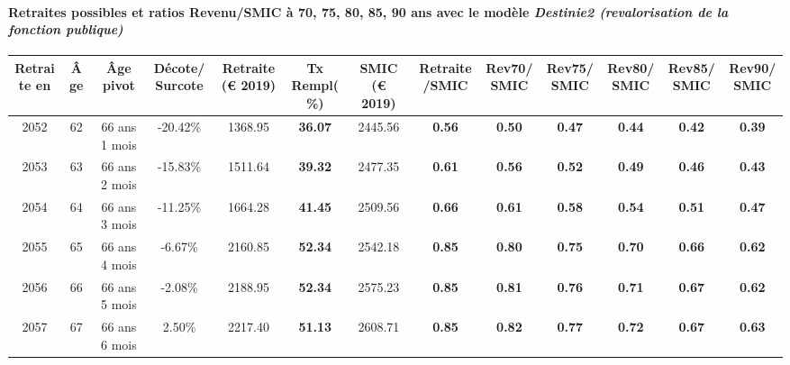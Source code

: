 \paragraph{Retraites possibles et ratios Revenu/SMIC à 70, 75, 80, 85, 90 ans avec le modèle \emph{Destinie2 (revalorisation de la fonction publique)}}  
 
{ \scriptsize \begin{center} 
\begin{tabular}[htb]{|c|c||c|c||c|c||c||c|c|c|c|c|c|} 
\hline 
 Retraite en &  Âge &  Âge pivot &  Décote/Surcote &  Retraite (\euro{} 2019) &  Tx Rempl(\%) &  SMIC (\euro{} 2019) &  Retraite/SMIC &  Rev70/SMIC &  Rev75/SMIC &  Rev80/SMIC &  Rev85/SMIC &  Rev90/SMIC \\ 
\hline \hline 
 2052 &  62 &  66 ans 1 mois &  -20.42\% &  1368.95 &  {\bf 36.07} &  2445.56 &  {\bf {\color{red} 0.56}} &  {\bf {\color{red} 0.50}} &  {\bf {\color{red} 0.47}} &  {\bf {\color{red} 0.44}} &  {\bf {\color{red} 0.42}} &  {\bf {\color{red} 0.39}} \\ 
\hline 
 2053 &  63 &  66 ans 2 mois &  -15.83\% &  1511.64 &  {\bf 39.32} &  2477.35 &  {\bf {\color{red} 0.61}} &  {\bf {\color{red} 0.56}} &  {\bf {\color{red} 0.52}} &  {\bf {\color{red} 0.49}} &  {\bf {\color{red} 0.46}} &  {\bf {\color{red} 0.43}} \\ 
\hline 
 2054 &  64 &  66 ans 3 mois &  -11.25\% &  1664.28 &  {\bf 41.45} &  2509.56 &  {\bf {\color{red} 0.66}} &  {\bf {\color{red} 0.61}} &  {\bf {\color{red} 0.58}} &  {\bf {\color{red} 0.54}} &  {\bf {\color{red} 0.51}} &  {\bf {\color{red} 0.47}} \\ 
\hline 
 2055 &  65 &  66 ans 4 mois &  -6.67\% &  2160.85 &  {\bf 52.34} &  2542.18 &  {\bf {\color{red} 0.85}} &  {\bf {\color{red} 0.80}} &  {\bf {\color{red} 0.75}} &  {\bf {\color{red} 0.70}} &  {\bf {\color{red} 0.66}} &  {\bf {\color{red} 0.62}} \\ 
\hline 
 2056 &  66 &  66 ans 5 mois &  -2.08\% &  2188.95 &  {\bf 52.34} &  2575.23 &  {\bf {\color{red} 0.85}} &  {\bf {\color{red} 0.81}} &  {\bf {\color{red} 0.76}} &  {\bf {\color{red} 0.71}} &  {\bf {\color{red} 0.67}} &  {\bf {\color{red} 0.62}} \\ 
\hline 
 2057 &  67 &  66 ans 6 mois &  2.50\% &  2217.40 &  {\bf 51.13} &  2608.71 &  {\bf {\color{red} 0.85}} &  {\bf {\color{red} 0.82}} &  {\bf {\color{red} 0.77}} &  {\bf {\color{red} 0.72}} &  {\bf {\color{red} 0.67}} &  {\bf {\color{red} 0.63}} \\ 
\hline 
\hline 
\end{tabular} 
\end{center} } 

